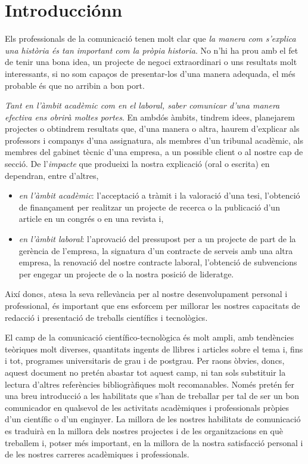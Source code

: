 
\chapter{Introducciónn}
Els professionals de la comunicació tenen molt clar que \emph{la manera com s'explica una història és tan important com la pròpia historia}. No n'hi ha prou amb el fet de tenir una bona idea, un projecte de negoci extraordinari o uns resultats molt interessants, si no som capaços de presentar-los d'una manera adequada, el més probable és que no arribin a bon port.

\emph{Tant en l'àmbit acadèmic com en el laboral, saber comunicar d'una manera efectiva ens obrirà moltes portes}. En ambdós àmbits, tindrem idees, planejarem projectes o obtindrem resultats que, d'una manera o altra, haurem d'explicar als professors i companys d'una assignatura, als membres d'un tribunal acadèmic, als membres del gabinet tècnic d'una empresa, a un possible client o al nostre cap de secció. De l'\emph{impacte} que produeixi la nostra explicació (oral o escrita) en dependran, entre d'altres,
\begin{itemize}
 \item \emph{en l'àmbit acadèmic}: l'acceptació a tràmit i la valoració d'una tesi, l'obtenció de finançament per realitzar un projecte de recerca o la publicació d'un article en un congrés o en una revista i,
 \item \emph{en l'àmbit laboral}: l'aprovació del pressupost per a un projecte de part de la gerència de l'empresa, la signatura d'un contracte de serveis amb una altra empresa, la renovació del nostre contracte laboral, l'obtenció de subvencions per engegar un projecte de  o la nostra posició de lideratge.
\end{itemize}
Així doncs, atesa la seva rellevància per al nostre desenvolupament personal i professional, és important que ens esforcem per millorar les nostres capacitats de redacció i presentació de treballs científics i tecnològics.

El camp de la comunicació científico-tecnològica és molt ampli, amb tendències teòriques molt diverses, quantitats ingents de llibres i articles sobre el tema i, fins i tot, programes universitaris de grau i de postgrau. Per raons òbvies, doncs, aquest document no pretén abastar tot aquest camp, ni tan sols substituir la lectura d'altres referències bibliogràfiques molt recomanables. Només pretén fer una breu introducció a les habilitats que s'han de treballar per tal de ser un bon comunicador en qualsevol de les activitats acadèmiques i professionals pròpies d'un científic o d'un enginyer. La millora de les nostres habilitats de comunicació es traduirà en la millora dels nostres projectes i de les organitzacions en què treballem i, potser més important, en la millora de la nostra satisfacció personal i de les nostres carreres acadèmiques i professionals.

